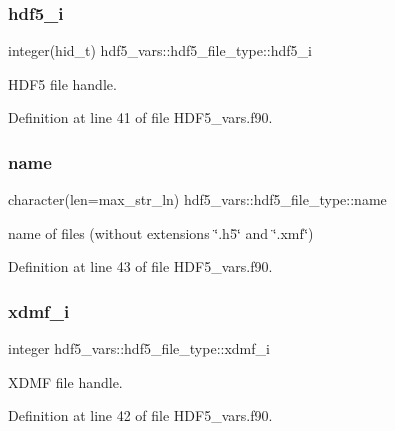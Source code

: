\subsubsection{\texorpdfstring{hdf5\+\_\+i}{hdf5\_i}}
{\footnotesize\ttfamily integer(hid\+\_\+t) hdf5\+\_\+vars\+::hdf5\+\_\+file\+\_\+type\+::hdf5\+\_\+i}



H\+D\+F5 file handle. 



Definition at line 41 of file H\+D\+F5\+\_\+vars.\+f90.

\mbox{\label{structhdf5__vars_1_1hdf5__file__type_a1739de1996623e79605d5000ffe97156}} 
\subsubsection{\texorpdfstring{name}{name}}
{\footnotesize\ttfamily character(len=max\+\_\+str\+\_\+ln) hdf5\+\_\+vars\+::hdf5\+\_\+file\+\_\+type\+::name}



name of files (without extensions \char`\"{}.\+h5\char`\"{} and \char`\"{}.\+xmf\char`\"{}) 



Definition at line 43 of file H\+D\+F5\+\_\+vars.\+f90.

\mbox{\label{structhdf5__vars_1_1hdf5__file__type_aceb5b42fcc6d848f1b0faaa9042b1a95}} 
\subsubsection{\texorpdfstring{xdmf\+\_\+i}{xdmf\_i}}
{\footnotesize\ttfamily integer hdf5\+\_\+vars\+::hdf5\+\_\+file\+\_\+type\+::xdmf\+\_\+i}



X\+D\+MF file handle. 



Definition at line 42 of file H\+D\+F5\+\_\+vars.\+f90.



